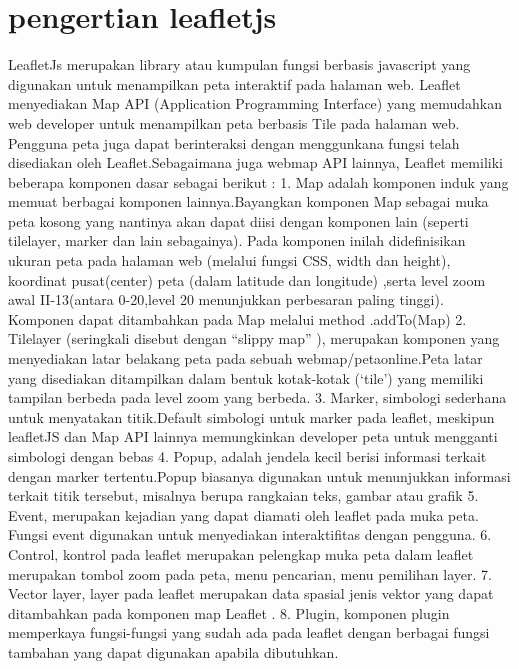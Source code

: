 \section{pengertian leafletjs}
LeafletJs merupakan  library  atau  kumpulan  fungsi  berbasis  javascript yang  digunakan  untuk  menampilkan  peta  interaktif  pada  halaman  web. Leaflet menyediakan  Map  API  (Application  Programming  Interface)  yang  memudahkan web   developer   untuk   menampilkan   peta   berbasis   Tile   pada   halaman   web. Pengguna   peta   juga   dapat   berinteraksi   dengan   menggunkana   fungsi   telah disediakan oleh Leaflet.Sebagaimana juga webmap API lainnya, Leaflet memiliki beberapa komponen dasar sebagai berikut :
1. Map  adalah  komponen  induk  yang  memuat  berbagai komponen  lainnya.Bayangkan komponen Map sebagai muka peta kosong yang nantinya akan dapat  diisi  dengan  komponen  lain  (seperti  tilelayer, marker  dan  lain sebagainya). Pada   komponen   inilah   didefinisikan   ukuran   peta   pada halaman   web   (melalui   fungsi   CSS, width   dan   height),  koordinat pusat(center)  peta  (dalam  latitude  dan  longitude)  ,serta  level  zoom  awal II-13(antara 0-20,level  20  menunjukkan  perbesaran  paling  tinggi). Komponen dapat ditambahkan pada Map melalui method .addTo(Map)
2. Tilelayer   (seringkali   disebut  dengan  “slippy  map” ),   merupakan komponen    yang    menyediakan    latar    belakang    peta    pada    sebuah webmap/petaonline.Peta  latar  yang  disediakan  ditampilkan  dalam  bentuk kotak-kotak (‘tile’) yang memiliki tampilan berbeda pada level zoom yang berbeda.
3. Marker,  simbologi  sederhana  untuk  menyatakan  titik.Default  simbologi untuk  marker  pada  leaflet,  meskipun  leafletJS  dan  Map  API  lainnya memungkinkan developer peta untuk mengganti simbologi dengan bebas
4. Popup, adalah jendela kecil berisi informasi terkait dengan marker tertentu.Popup  biasanya  digunakan  untuk  menunjukkan  informasi  terkait  titik tersebut, misalnya berupa rangkaian teks, gambar atau grafik
5. Event, merupakan kejadian yang dapat diamati oleh leaflet pada muka peta. Fungsi    event    digunakan    untuk    menyediakan    interaktifitas    dengan pengguna.
6. Control,  kontrol  pada  leaflet  merupakan  pelengkap  muka  peta  dalam leaflet   merupakan   tombol   zoom   pada   peta, menu   pencarian, menu pemilihan layer.
7. Vector  layer,  layer  pada  leaflet  merupakan  data  spasial  jenis  vektor  yang dapat ditambahkan pada komponen map Leaflet .
8. Plugin, komponen plugin memperkaya fungsi-fungsi yang sudah ada pada leaflet dengan berbagai fungsi tambahan yang dapat digunakan apabila dibutuhkan.


